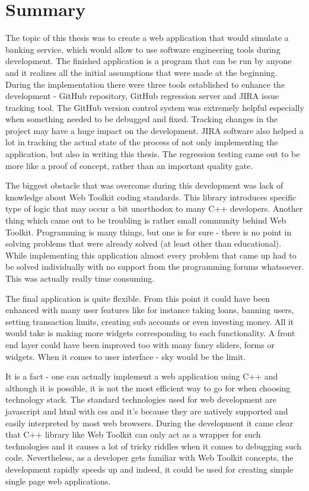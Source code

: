 \documentclass[a4paper,12pt]{book}
\newcommand\tab[1][1cm]{\hspace*{#1}}
\begin{document}
\chapter{Summary}
{

\tab The topic of this thesis was to create a web application that would simulate a banking service, which would allow to use software engineering tools during development. The finished application is a program that can be run by anyone and it realizes all the initial assumptions that were made at the beginning. During the implementation there were three tools established to enhance the development - GitHub repository, GitHub regression server and JIRA issue tracking tool. The GitHub version control system was extremely helpful especially when something needed to be debugged and fixed. Tracking changes in the project may have a huge impact on the development. JIRA software also helped a lot in tracking the actual state of the process of not only implementing the application, but also in writing this thesis. The regression testing came out to be more like a proof of concept, rather than an important quality gate. 

\bigskip
The biggest obstacle that was overcome during this development was lack of knowledge about Web Toolkit coding standards. This library introduces specific type of logic that may occur a bit unorthodox to many C++ developers. Another thing which came out to be troubling is rather small community behind Web Toolkit. Programming is many things, but one is for sure - there is no point in solving problems that were already solved (at least other than educational). While implementing this application almost every problem that came up had to be solved individually with no support from the programming forums whatsoever. This was actually really time consuming. 

\bigskip
The final application is quite flexible. From this point it could have been enhanced with many user features like for instance taking loans, banning users, setting transaction limits, creating sub accounts or even investing money. All it would take is making more widgets corresponding to each functionality. A front end layer could have been improved too with many fancy sliders, forms or widgets. When it comes to user interface - sky would be the limit.

\bigskip
It is a fact - one can actually implement a web application using C++ and although it is possible, it is not the most efficient way to go for when choosing technology stack. The standard technologies used for web development are javascript and html with css and it's because they are natively supported and easily interpreted by most web browsers. During the development it came clear that C++ library like Web Toolkit can only act as a wrapper for such technologies and it causes a lot of tricky riddles when it comes to debugging such code. Nevertheless, as a developer gets familiar with Web Toolkit concepts, the development rapidly speeds up and indeed, it could be used for creating simple single page web applications.

}
\end{document}

